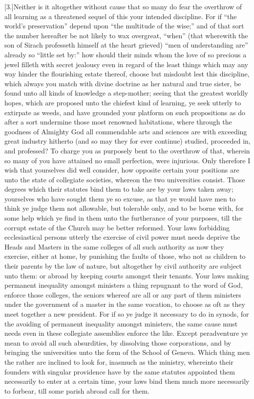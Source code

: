 [3.]Neither is it altogether without cause that so many do fear the overthrow of all learning as a threatened sequel of this your intended discipline. For if “the world’s preservation” depend upon “the multitude of the wise;” and of that sort the number hereafter be not likely to wax overgreat, “when” (that wherewith the son of Sirach professeth himself at the heart grieved) “men of understanding are” already so “little set by:” how should their minds whom the love of so precious a jewel filleth with secret jealousy even in regard of the least things which may any way hinder the flourishing estate thereof, choose but misdoubt lest this discipline, which always you match with divine doctrine as her natural and true sister, be found unto all kinds of knowledge a step-mother; seeing that the greatest worldly hopes, which are proposed unto the chiefest kind of learning, ye seek utterly to extirpate as weeds, and have grounded your platform on such propositions as do after a sort undermine those most renowned habitations, where through the goodness of Almighty God all commendable arts and sciences are with exceeding great industry hitherto (and so may they for ever continue) studied, proceeded in, and professed? To charge you as purposely bent to the overthrow of that, wherein so many of you have attained no small perfection, were injurious. Only therefore I wish that yourselves did well consider, how opposite certain your positions are unto the state of collegiate societies, whereon the two universities consist. Those degrees which their statutes bind them to take are by your laws taken away; yourselves who have sought them ye so excuse, as that ye would have men to think ye judge them not allowable, but tolerable only, and to be borne with, for some help which ye find in them unto the furtherance of your purposes, till the corrupt estate of the Church may be better reformed. Your laws forbidding ecclesiastical persons utterly the exercise of civil power must needs deprive the Heads and Masters in the same colleges of all such authority as now they exercise, either at home, by punishing the faults of those, who not as children to their parents by the law of nature, but altogether by civil authority are subject unto them: or abroad by keeping courts amongst their tenants. Your laws making permanent inequality amongst ministers a thing repugnant to the word of God, enforce those colleges, the seniors whereof are all or any part of them ministers under the government of a master in the same vocation, to choose as oft as they meet together a new president. For if so ye judge it necessary to do in synods, for the avoiding of permanent inequality amongst ministers, the same cause must needs even in these collegiate assemblies enforce the like. Except peradventure ye mean to avoid all such absurdities, by dissolving those corporations, and by bringing the universities unto the form of the School of Geneva. Which thing men the rather are inclined to look for, inasmuch as the ministry, whereinto their founders with singular providence have by the same statutes appointed them necessarily to enter at a certain time, your laws bind them much more necessarily to forbear, till some parish abroad call for them.

